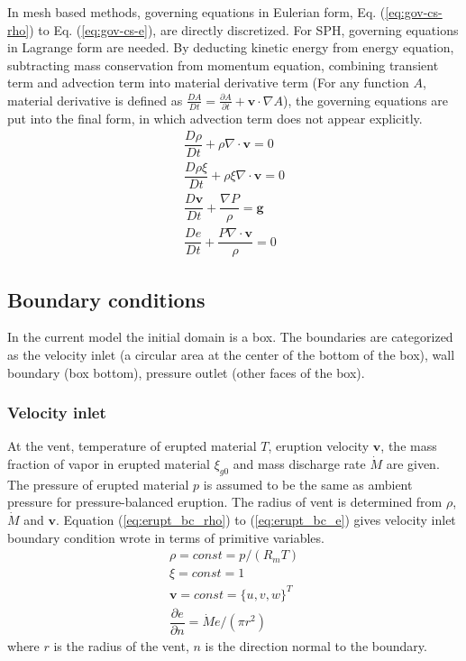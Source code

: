 In mesh based methods, governing equations in Eulerian form, Eq. (\ref{eq:gov-cs-rho}) to Eq. (\ref{eq:gov-cs-e}), are directly discretized. For SPH, governing equations in Lagrange form are needed. By deducting kinetic energy from energy equation, subtracting mass conservation from momentum equation, combining transient term and advection term into material derivative term (For any function $A$, material derivative is defined as $\frac{D A}{Dt} = \frac{\partial A}{\partial t} + \textbf{v} \cdot \nabla A$), the governing equations are put into the final form, in which advection term does not appear explicitly.
\begin{align}
\dfrac{D \rho}{D t} + \rho \nabla \cdot \textbf{v} = 0 \label{eq:gov-nc-rho}\\
\dfrac{D \rho \xi}{D t} + \rho \xi \nabla \cdot \textbf{v} = 0 \label{eq:gov-nc-ks}\\
\dfrac{D \textbf{v}}{D t} + \dfrac{\nabla P}{\rho} =\textbf{g} \label{eq:gov-nc-v}\\
\dfrac{D e}{D t} + \dfrac{P \nabla \cdot \textbf{v}}{\rho} = 0 \label{eq:gov-nc-e}
\end{align}

\subsection{Boundary conditions}
In the current model the initial domain is a box. The boundaries are categorized as the velocity inlet (a circular area at the center of the bottom of the box), wall boundary (box bottom), pressure outlet (other faces of the box).

\subsubsection{Velocity inlet}
At the vent, temperature of erupted material $T$, eruption velocity $\textbf{v}$, the mass fraction of vapor in erupted material $\xi_{g0}$ and mass discharge rate $\dot M$ are given. The pressure of erupted material $p$ is assumed to be the same as ambient pressure for pressure-balanced eruption. The radius of vent is determined from $\rho$, $\dot M$ and $\textbf{v}$. Equation (\ref{eq:erupt_bc_rho}) to (\ref{eq:erupt_bc_e}) gives velocity inlet boundary condition wrote in terms of primitive variables.
\begin{align}
\rho =const = p/\left(R_m T\right) \label{eq:erupt_bc_rho} \\
\xi=const=1 \label{eq:erupt_bc_xi}\\
\textbf{v} = const =\{u,v,w\}^T \label{eq:erupt_bc_v}\\
\dfrac{\partial e}{\partial n}=\dot M e /\left(\pi r^2\right) \label{eq:erupt_bc_e}
\end{align} 
where $r$ is the radius of the vent, $n$ is the direction normal to the boundary.

